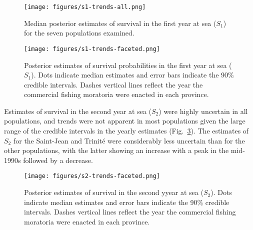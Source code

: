 \documentclass[12pt]{article}
\newcommand{\So}{$S_{1}$\xspace}
\newcommand{\St}{$S_{2}$\xspace}
\begin{document}

\begin{figure}[htbp] \centering
    \texttt{[image: figures/s1-trends-all.png]}
    \caption{Median posterior estimates of survival in the first year at sea (\So)
        for the seven populations examined.} \label{fig:s1-dual}
\end{figure}


\begin{figure}[htbp] \centering
    \texttt{[image: figures/s1-trends-faceted.png]}
    \caption{Posterior estimates of survival probabilities in the first year at sea (\So). Dots indicate median estimates and error
        bars indicate the 90\% credible intervals. Dashes vertical lines reflect the year the commercial fishing moratoria were enacted
    in each province.} \label{fig:s1-faceted}
\end{figure}

Estimates of survival in the second year at sea (\St) were highly uncertain in all populations, and trends
were not apparent in most populations given the large range of the credible
intervals in the yearly estimates (Fig.~\ref{fig:s2-faceted}). The estimates
of \St for the Saint-Jean and Trinit\'{e} were considerably less uncertain
than for the other populations, with the latter showing an increase with a peak in the mid-1990s followed
by a decrease.

\begin{figure}[htbp] \centering
    \texttt{[image: figures/s2-trends-faceted.png]}
    \caption{Posterior estimates of survival in the second yyear at sea (\St).
 Dots indicate median estimates and error bars indicate the 90\% credible
 intervals. Dashes vertical lines reflect the year the commercial fishing
 moratoria were enacted in each province.} \label{fig:s2-faceted}
\end{figure}
\end{document}
